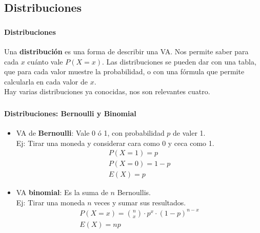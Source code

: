 \documentclass{beamer}
\begin{document}
\subsection{Distribuciones}

\begin{frame}
  \frametitle{\SECTIONA}
  \framesubtitle{Distribuciones}

  Una \textbf{distribución} es una forma de describir una VA. Nos permite saber para cada \(x\) cuánto vale \(P(X = x)\). Las distribuciones se pueden dar con una tabla, que para cada valor muestre la probabilidad, o con una fórmula que permite calcularla en cada valor de \(x\). \pause \\
  Hay varias distribuciones ya conocidas, nos son relevantes cuatro.
\end{frame}

\begin{frame}
  \frametitle{\SECTIONA}
  \framesubtitle{Distribuciones: Bernoulli y Binomial}

  \begin{itemize}
    \item VA de \textbf{Bernoulli}: Vale 0 ó 1, con probabilidad \(p\) de valer 1. \\
      Ej: Tirar una moneda y considerar cara como 0 y ceca como 1.
      \begin{gather*}
        P(X = 1) = p \\
        P(X = 0) = 1 - p \\
        E(X) = p
      \end{gather*}
    \item<2-> VA \textbf{binomial}: Es la suma de \(n\) Bernoullis. \\
      Ej: Tirar una moneda \(n\) veces y sumar sus resultados.
      \begin{gather*}
        P(X = x) = \binom{n}{x} \cdot p^{x} \cdot (1 - p)^{n - x} \\
        E(X) = np
      \end{gather*}
  \end{itemize}
\end{frame}
\end{document}
